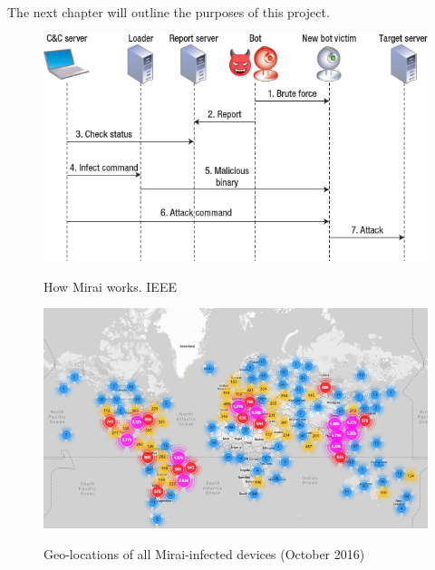 \documentclass{report}
\begin{document}
The next chapter will outline the purposes of this project.
\newpage
\begin{figure}[h]
 \caption{How Mirai works. IEEE \protect\footnotemark}
 \centering
 \includegraphics[width=1.2\textwidth]{./img/botnet-fonct}
 \label{fig:botnet-fonct}
\end{figure}
\newpage
\begin{figure}
 \caption{Geo-locations of all Mirai-infected devices (October 2016) \autocite{mirai-cov}}
 \centering
 \includegraphics[width=1\textwidth]{./img/mirai-botnet-map}
 \label{fig:mirai-geoloc}
\end{figure}
\end{document}
